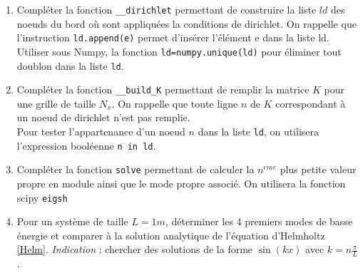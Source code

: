 \documentclass[a4paper, 12pt]{article}
\newcommand{\matlabscript}[2]
  {\begin{itemize}\item[]\end{itemize}}
\begin{document}
\begin{enumerate} 

\item Compléter la fonction  {\tt \_\_dirichlet} permettant de construire la liste $ld$ 
des noeuds du bord où sont appliquées la conditions de dirichlet.
On rappelle que
l'instruction {\tt ld.append(e)} permet d'insérer l'élément e dans la liste ld. 
Utiliser sous Numpy, la fonction {\tt ld=numpy.unique(ld)} pour éliminer tout doublon dans la liste {\tt ld}.


\item Compléter la fonction  {\tt \_\_build\_K} permettant de remplir la matrice $K$ pour une grille
de taille $N_x$.  On rappelle que toute ligne $n$ de $K$ correspondant à un noeud
de dirichlet n'est pas remplie. \\
Pour tester l'appartenance d'un noeud $n$ dans la liste {\tt ld}, on utilisera l'expression booléenne
 {\tt n in ld}. 

\item Compléter  la fonction  {\tt solve} permettant de calculer la $n^{eme}$ plus petite valeur propre
en module ainsi que le mode propre associé. On utilisera la fonction scipy {\tt eigsh} 

\item Pour un système de taille $L=1m$, déterminer les 4 premiers modes de basse énergie et comparer à la solution analytique de l'équation d'Helmholtz \eqref{Helm}. 
{\it Indication} : chercher des solutions de la forme $\sin(k x)$ avec $k = n \frac{\pi}{L}$.

\end{enumerate} 



 
\end{document}

